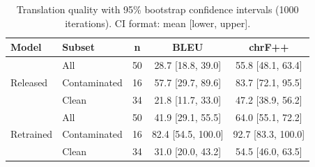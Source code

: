 
\begin{table}[t]
\centering
\small
\begin{tabular}{llccc}
\toprule
\textbf{Model} & \textbf{Subset} & \textbf{n} & \textbf{BLEU} & \textbf{chrF++} \\
\midrule
\multirow{3}{*}{Released} & All & 50 & 28.7 [18.8, 39.0] & 55.8 [48.1, 63.4] \\
 & Contaminated & 16 & 57.7 [29.7, 89.6] & 83.7 [72.1, 95.5] \\
 & Clean & 34 & 21.8 [11.7, 33.0] & 47.2 [38.9, 56.2] \\
\midrule
\multirow{3}{*}{Retrained} & All & 50 & 41.9 [29.1, 55.5] & 64.0 [55.1, 72.2] \\
 & Contaminated & 16 & 82.4 [54.5, 100.0] & 92.7 [83.3, 100.0] \\
 & Clean & 34 & 31.0 [20.0, 43.2] & 54.5 [46.0, 63.5] \\
\midrule
\bottomrule
\end{tabular}
\caption{Translation quality with 95\% bootstrap confidence intervals (1000 iterations). CI format: mean [lower, upper].}
\label{tab:bootstrap-results}
\end{table}
